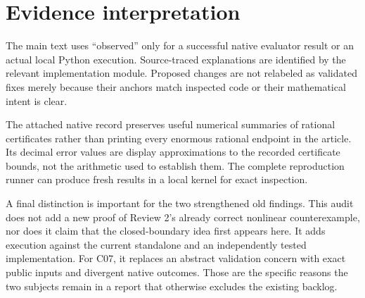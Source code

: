\documentclass[11pt,letterpaper]{article}
\begin{document}
\section{Evidence interpretation}
The main text uses ``observed'' only for a successful native evaluator result or an actual local Python execution. Source-traced explanations are identified by the relevant implementation module. Proposed changes are not relabeled as validated fixes merely because their anchors match inspected code or their mathematical intent is clear.

The attached native record preserves useful numerical summaries of rational certificates rather than printing every enormous rational endpoint in the article. Its decimal error values are display approximations to the recorded certificate bounds, not the arithmetic used to establish them. The complete reproduction runner can produce fresh results in a local kernel for exact inspection.

A final distinction is important for the two strengthened old findings. This audit does not add a new proof of Review 2's already correct nonlinear counterexample, nor does it claim that the closed-boundary idea first appears here. It adds execution against the current standalone and an independently tested implementation. For C07, it replaces an abstract validation concern with exact public inputs and divergent native outcomes. Those are the specific reasons the two subjects remain in a report that otherwise excludes the existing backlog.
\end{document}
